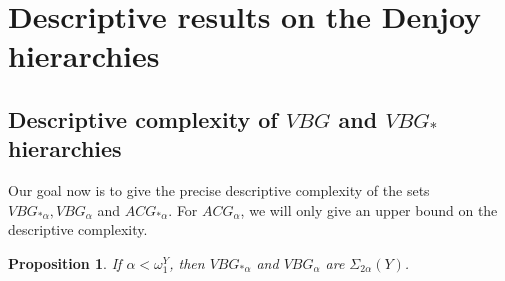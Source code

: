 \documentclass[12pt]{amsart}
\newtheorem{prop}[theorem]{Proposition}
\begin{document}
\section{Descriptive results on the Denjoy hierarchies}\label{sec:descriptions}

\subsection{Descriptive complexity of $VBG$ and $VBG_\ast$ hierarchies}
Our goal now is to give the precise descriptive complexity of 
the sets $VBG_{\ast\alpha}, VBG_\alpha$ and $ACG_{\ast\alpha}$. 
For $ACG_\alpha$, we will only give an upper bound on the descriptive
complexity.

\begin{prop}\label{VBGsigma2alpha}
If $\alpha < \omega_1^Y$, then $VBG_{\ast\alpha}$ and $VBG_\alpha$ are
$\Sigma_{2\alpha}(Y)$.
\end{prop}
\end{document}
